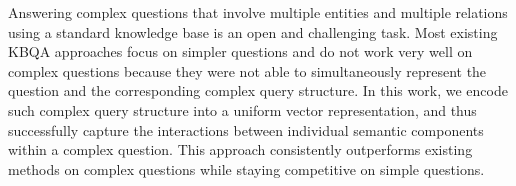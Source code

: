Answering complex questions that involve multiple entities and multiple relations using a standard knowledge base is an open and challenging task. Most existing KBQA approaches focus on simpler questions and do not work very well on complex questions because they were not able to simultaneously represent the question and the corresponding complex query structure. In this work, we encode such complex query structure into a uniform vector representation, and thus successfully capture the interactions between individual semantic components within a complex question. This approach consistently outperforms existing methods on complex questions while staying competitive on simple questions.
